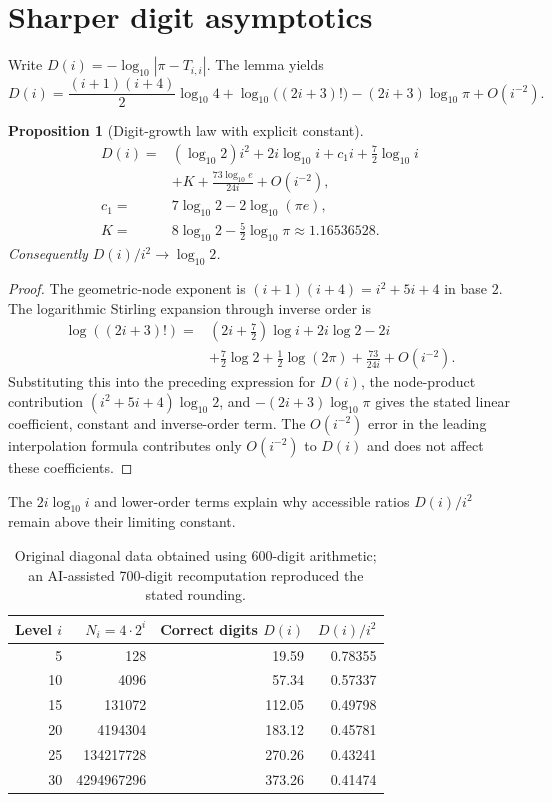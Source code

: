 \documentclass[11pt]{article}
\newtheorem{proposition}{Proposition}
\begin{document}
\section{Sharper digit asymptotics}
Write $D(i)=-\log_{10}|\pi-T_{i,i}|$. The lemma yields
\[
D(i)=\frac{(i+1)(i+4)}2\log_{10}4+\log_{10}\bigl((2i+3)!\bigr)-(2i+3)\log_{10}\pi+O(i^{-2}).
\]
\begin{proposition}[Digit-growth law with explicit constant]\label{prop:digits}
\[
\begin{aligned}
D(i)={}&(\log_{10}2)i^2+2i\log_{10}i+c_1i+\tfrac72\log_{10}i\\
&+K+\frac{73\log_{10}e}{24i}+O(i^{-2}),\\
c_1={}&7\log_{10}2-2\log_{10}(\pi e),\\
K={}&8\log_{10}2-\tfrac52\log_{10}\pi\approx1.16536528.
\end{aligned}
\]
Consequently $D(i)/i^2\to\log_{10}2$.
\end{proposition}
\begin{proof}
The geometric-node exponent is $(i+1)(i+4)=i^2+5i+4$ in base $2$. The logarithmic Stirling expansion through inverse order is
\[
\begin{aligned}
\log((2i+3)!)={}&(2i+\tfrac72)\log i+2i\log2-2i\\
&+\tfrac72\log2+\tfrac12\log(2\pi)
+\frac{73}{24i}+O(i^{-2}).
\end{aligned}
\]
Substituting this into the preceding expression for $D(i)$, the node-product contribution $(i^2+5i+4)\log_{10}2$, and $-(2i+3)\log_{10}\pi$ gives the stated linear coefficient, constant and inverse-order term. The $O(i^{-2})$ error in the leading interpolation formula contributes only $O(i^{-2})$ to $D(i)$ and does not affect these coefficients.
\end{proof}
The $2i\log_{10}i$ and lower-order terms explain why accessible ratios $D(i)/i^2$ remain above their limiting constant.
\begin{table}[ht]\centering\small
\begin{tabular}{rrrr}\toprule Level $i$ & $N_i=4\cdot2^i$ & Correct digits $D(i)$ & $D(i)/i^2$\\\midrule
5&128&19.59&0.78355\\10&4096&57.34&0.57337\\15&131072&112.05&0.49798\\20&4194304&183.12&0.45781\\25&134217728&270.26&0.43241\\30&4294967296&373.26&0.41474\\\bottomrule\end{tabular}
\caption{Original diagonal data obtained using 600-digit arithmetic; an AI-assisted 700-digit recomputation reproduced the stated rounding.}\label{tab:tower}
\end{table}
\end{document}
